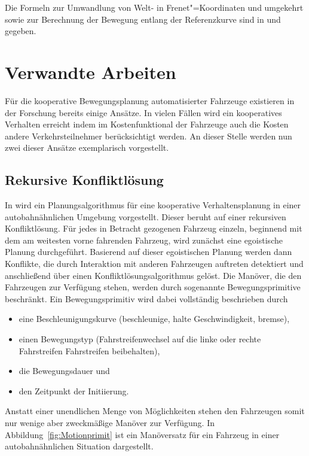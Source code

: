 Die Formeln zur Umwandlung von Welt- in Frenet"=Koordinaten und umgekehrt sowie zur Berechnung der Bewegung entlang der Referenzkurve sind in \cite{Werling2011} und \cite{Rathgeber2016} gegeben.




\section{Verwandte Arbeiten}
F\"ur die kooperative Bewegungsplanung automatisierter Fahrzeuge existieren in der Forschung bereits einige Ans\"atze.
In vielen F\"allen wird ein kooperatives Verhalten erreicht indem im Kostenfunktional der Fahrzeuge auch die Kosten andere Verkehrsteilnehmer ber\"ucksichtigt werden.
An dieser Stelle werden nun zwei dieser Ans\"atze exemplarisch vorgestellt.


\subsection{Rekursive Konfliktl\"osung}
In \cite{Schwarting2014} wird ein Planungsalgorithmus f\"ur eine kooperative Verhaltensplanung in einer autobahn\"ahnlichen Umgebung vorgestellt. 
Dieser beruht auf  einer rekursiven Konfliktl\"osung.
F\"ur jedes in Betracht gezogenen Fahrzeug einzeln, beginnend mit dem am weitesten vorne fahrenden Fahrzeug, wird zun\"achst eine egoistische Planung durchgef\"uhrt. 
Basierend auf dieser egoistischen Planung werden dann Konflikte, die durch Interaktion mit anderen Fahrzeugen auftreten detektiert und anschlie{\ss}end \"uber einen Konfliktl\"osungsalgorithmus gel\"ost. 
Die Man\"over, die den Fahrzeugen zur Verf\"ugung stehen, werden durch sogenannte Bewegungsprimitive beschr\"ankt. 
Ein Bewegungsprimitiv wird dabei vollst\"andig beschrieben durch
\begin{itemize}
\item eine Beschleunigungskurve (beschleunige, halte Geschwindigkeit, bremse),
\item einen Bewegungstyp (Fahrstreifenwechsel auf die linke oder rechte Fahrstreifen Fahrstreifen beibehalten),
\item die Bewegungsdauer und
\item den Zeitpunkt der Initiierung.
\end{itemize}
Anstatt einer unendlichen Menge von M\"oglichkeiten stehen den Fahrzeugen somit nur wenige aber zweckm\"a{\ss}ige Man\"over zur Verf\"ugung. 
In Abbildung~\ref{fig:Motionprimit} ist ein Man\"oversatz f\"ur ein Fahrzeug in einer autobahn\"ahnlichen Situation dargestellt.

